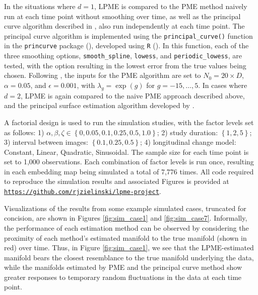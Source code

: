 \documentclass[11pt,reqno]{article}
\theoremstyle{definition}
\begin{document}
In the situations where $d = 1$, LPME is compared to the PME method naively run at each time point without smoothing over time, as well as the principal curve algorithm described in \cite{hastiePrincipalCurves1989}, also run independently at each time point. The principal curve algorithm is implemented using the \texttt{principal\_curve()} function in the \texttt{princurve} package (\cite{hastie2022package}), developed using \texttt{R} (\cite{rSoftware2023}). In this function, each of the three smoothing options, \texttt{smooth\_spline}, \texttt{lowess}, and \texttt{periodic\_lowess}, are tested, with the option resulting in the lowest error from the true values being chosen. Following \cite{mengPrincipalManifoldEstimation2021}, the inputs for the PME algorithm are set to $N_0 = 20 \times D$, $\alpha = 0.05$, and $\epsilon = 0.001$, with $\lambda_g = \exp(g)$ for $g = -15, \dots, 5$. In cases where $d = 2$, LPME is again compared to the naive PME approach described above, and the principal surface estimation algorithm developed by \cite{yueParameterizationWhiteMatter2016}.

A factorial design is used to run the simulation studies, with the factor levels set as follows: 1) $\alpha, \beta, \zeta \in \left\{0, 0.05, 0.1, 0.25, 0.5, 1.0\right\}$; 2) study duration: $\left\{1, 2, 5\right\}$; 3) interval between images: $\left\{0.1, 0.25, 0.5\right\}$; 4) longitudinal change model: Constant, Linear, Quadratic, Sinusoidal. The sample size for each time point is set to 1,000 observations. Each combination of factor levels is run once, resulting in each embedding map being simulated a total of 7,776 times. All code required to reproduce the simulation results and associated Figures is provided at \href{https://github.com/rjzielinski/lpme-project}{\texttt{https://github.com/rjzielinski/lpme-project}}.

Visualizations of the results from some example simulated cases, truncated for concision, are shown in Figures \ref{fig:sim_case1} and \ref{fig:sim_case7}. Informally, the performance of each estimation method can be observed by considering the proximity of each method's estimated manifold to the true manifold (shown in red) over time. Thus, in Figure \ref{fig:sim_case1}, we see that the LPME-estimated manifold bears the closest resemblance to the true manifold underlying the data, while the manifolds estimated by PME and the principal curve method show greater responses to temporary random fluctuations in the data at each time point.
\end{document}
